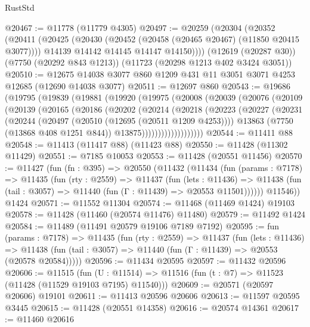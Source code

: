\begin{lexlean}{RustStd}
\begin{coremodule}
@20467 := @11778 (@11779 @4305)
@20497 := @20259
    (@20304
      (@20352
        (@20411
          (@20425
            (@20430 (@20452 (@20458 (@20465 @20467) (@11850 @20415 @3077))))
            @14139
            @14142
            @14145
            @14147
            @14150))))
    (@12619 (@20287 @30))
    (@7750 (@20292 @843 @1213))
    (@11723 (@20298 @1213 @402 @3424 @3051))
@20510 := @12675 @14038 @3077 @860 @1209 @431 @11 @3051 @3071 @4253 @12685 (@12690 @14038 @3077)
@20511 := @12697 @860
@20543 := @19686
    (@19795
      (@19839
        (@19881
          (@19920
            (@19975
              (@20008
                (@20039
                  (@20076
                    (@20109
                      (@20139
                        (@20165
                          (@20186
                            (@20202
                              (@20214
                                (@20218
                                  (@20223
                                    (@20227
                                      (@20231
                                        (@20244
                                          (@20497 (@20510 (@12695 (@20511 @1209 @4253))))
                                          @13863
                                          (@7750 (@13868 @408 @1251 @844))
                                          @13875)))))))))))))))))))
@20544 := @11411 @88
@20548 := @11413 (@11417 @88) (@11423 @88)
@20550 := @11428 (@11302 @11429)
@20551 := @7185 @10053
@20553 := @11428 (@20551 @11456)
@20570 := @11427
    (fun (fn : @395) =>
    @20550
      (@11432
        (@11434
          (fun (params : @7178) =>
          @11435
            (fun (rty : @2559) =>
            @11437
              (fun (lets : @11436) =>
              @11438 (fun (tail : @3057) => @11440 (fun (Γ : @11439) => @20553 @11501))))))
        @11546))
    @1424
@20571 := @11552 @11304
@20574 := @11468 (@11469 @1424) @19103
@20578 := @11428 (@11460 (@20574 @11476) @11480)
@20579 := @11492 @1424
@20584 := @11489 (@11491 @20579 @19106 @7189 @7192)
@20595 := fun (params : @7178) =>
  @11435
    (fun (rty : @2559) =>
    @11437
      (fun (lets : @11436) =>
      @11438 (fun (tail : @3057) => @11440 (fun (Γ : @11439) => @20553 (@20578 @20584)))))
@20596 := @11434 @20595
@20597 := @11432 @20596
@20606 := @11515
    (fun (U : @11514) => @11516 (fun (t : @7) => @11523 (@11428 (@11529 @19103 @7195) @11540)))
@20609 := @20571 (@20597 @20606) @19101
@20611 := @11413 @20596 @20606
@20613 := @11597 @20595 @3445
@20615 := @11428 (@20551 @14358)
@20616 := @20574 @14361
@20617 := @11460 @20616

\end{coremodule}
\end{lexlean}
